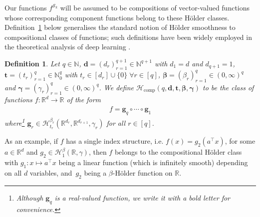 \documentclass[12pt]{article}
\newtheorem{defn}{Definition}
\begin{document}
Our functions $f^{\mathcal{S}_k}$ will be assumed to be compositions of vector-valued functions whose corresponding component functions belong to these H\"older classes.  Definition~\ref{defn:holder-composition-class} below generalises the standard notion of H\"older smoothness to compositional classes of functions; such definitions have been widely employed in the theoretical analysis of deep learning \citep[e.g.][]{schmidt-hieber2020nonparametric,kohler2021rate,fan2024factor}.
\begin{defn} \label{defn:holder-composition-class}
    Let $q\in\mathbb{N}$, $\bm d = (d_r)_{r=1}^{q+1} \in \mathbb{N}^{q+1}$ with $d_1=d$ and $d_{q+1} = 1$, $\bm t = (t_r)_{r=1}^q \in \mathbb{N}_0^q$ with $t_r \in [d_r] \cup \{0\} \;\forall r\in[q]$, $\bm\beta = (\beta_r)_{r=1}^q \in (0,\infty)^q$ and $\bm\gamma = (\gamma_r)_{r=1}^q \in (0,\infty)^q$. We define $\mathcal{H}_{\mathrm{comp}}(q,\bm d, \bm t, \bm\beta, \bm\gamma)$ to be the class of functions $f:\mathbb{R}^d \to \mathbb{R}$ of the form
    \begin{align*}
        f = \bm g_q \circ \cdots \circ \bm g_1 
    \end{align*} 
    where\footnote{Although $\bm g_{q}$ is a real-valued function, we write it with a bold letter for convenience.} $\bm g_{r} \in \mathcal{H}_{t_r}^{\beta_r}(\mathbb{R}^{d_r}, \mathbb{R}^{d_{r+1}}, \gamma_r)$ for all $r \in [q]$.  
\end{defn}
As an example, if $f$ has a single index structure, i.e. $f(x) = g_2(a^\top x)$, for some $a \in \mathbb{R}^d$ and $g_2\in\mathcal{H}_1^{\beta}(\mathbb{R},\gamma)$, then $f$ belongs to the compositional H\"older class with $g_1:x\mapsto a^\top x$ being a linear function (which is infinitely smooth) depending on all $d$ variables, and~$g_2$ being a $\beta$-H\"older function on $\mathbb{R}$. 
\end{document}
